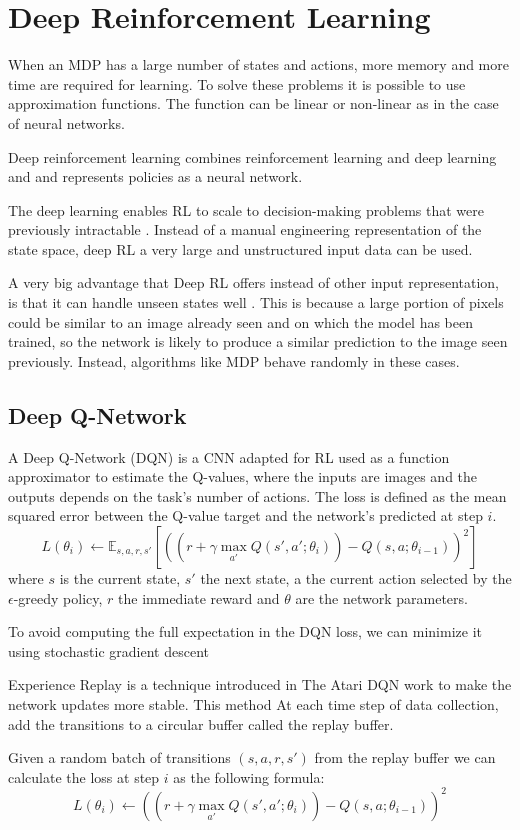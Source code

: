 \section{Deep Reinforcement Learning}
When an MDP has a large number of states and actions, more memory and more time are required for learning.
To solve these problems it is possible to use approximation functions.
The function can be linear \cite{melo2008analysis} or non-linear as in the case of neural networks.

Deep reinforcement learning \cite{arulkumaran2017deep} combines reinforcement learning and deep learning and and represents policies as a neural network.

The deep learning enables RL to scale to decision-making problems that were previously intractable \cite{arulkumaran2017deep}.
Instead of a manual engineering representation of the state space, deep RL a very large and unstructured input data can be used.

A very big advantage that Deep RL offers instead of other input representation,
is that it can handle unseen states well \cite{mnih2013playing} \cite{karpathy2016deep}.
This is because a large portion of pixels could be similar to an image already seen and on which the model has been trained, so the network is likely to produce a similar prediction to the image seen previously. Instead, algorithms like MDP behave randomly in these cases.

\subsection{Deep Q-Network}
A Deep Q-Network (DQN) \cite{mnih2013playing} is a CNN adapted for RL used as a function approximator to estimate the Q-values, where the inputs are images and the outputs depends on the task's number of actions.
The loss is defined as the mean squared error between the Q-value target and the network's predicted at step $i$.
\begin{equation}
    L(\theta_i) \leftarrow \mathbb{E}_{s, a, r, s'} [((r + \gamma \max_{a'} Q(s', a'; \theta_i)) - Q(s, a; \theta_{i-1}))^2]
\end{equation}
where $s$ is the current state, $s'$ the next state, a the current action selected by the $\epsilon$-greedy policy, $r$ the immediate reward and $\theta$ are the network parameters.

To avoid computing the full expectation in the DQN loss, we can minimize it using stochastic gradient descent

Experience Replay is a technique introduced in The Atari DQN work to make the network updates more stable.
This method At each time step of data collection, add the transitions to a circular buffer called the replay buffer.

Given a random batch of transitions $(s, a, r, s')$ from the replay buffer we can calculate the loss at step $i$ as the following formula:
\begin{equation}
    L(\theta_i) \leftarrow ((r + \gamma \max_{a'} Q(s', a'; \theta_i)) - Q(s, a; \theta_{i-1}))^2
\end{equation}
